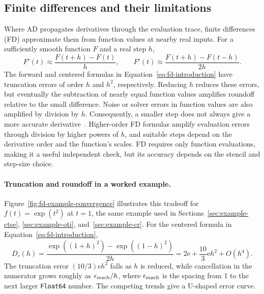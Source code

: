 \documentclass[10pt]{article}
\begin{document}
\subsection{Finite differences and their limitations}
\label{sec:fd-introduction}
Where AD propagates derivatives through the evaluation trace, finite
differences (FD) approximate them from function values at nearby real inputs. For a sufficiently smooth function $F$ and a real step $h$,
\begin{equation}
\label{eq:fd-introduction}
 F'(t)\approx\frac{F(t+h)-F(t)}{h},\qquad
 F'(t)\approx\frac{F(t+h)-F(t-h)}{2h}.
\end{equation}
The forward and centered formulas in Equation~\eqref{eq:fd-introduction} have
truncation errors of order $h$ and $h^2$, respectively. Reducing $h$ reduces these
errors, but eventually the subtraction of nearly equal function values amplifies
roundoff relative to the small difference. Noise or solver errors in function
values are also amplified by division by $h$. Consequently, a smaller step does
not always give a more accurate derivative~\cite{martins-guide}. Higher-order
FD formulas amplify evaluation errors through division by higher powers of $h$,
and suitable steps depend on the derivative order and the function's scales.
FD requires only function evaluations, making it a useful independent check,
but its accuracy depends on the stencil and step-size choice.


\newpage
\paragraph{Truncation and roundoff in a worked example.}
Figure~\ref{fig:fd-example-convergence} illustrates this tradeoff for
$f(t)=\exp(t^2)$ at $t=1$, the same example used in
Sections~\ref{sec:example-ctse}, \ref{sec:example-oti}, and~\ref{sec:example-cr}.
For the centered formula in Equation~\eqref{eq:fd-introduction},
\begin{equation}
\label{eq:fd-example-error}
 D_c(h)=\frac{\exp((1+h)^2)-\exp((1-h)^2)}{2h}
       =2\mathrm e+\frac{10}{3}\mathrm e h^2+O(h^4).
\end{equation}
The truncation error $(10/3)\mathrm e h^2$ falls as $h$ is reduced, while
cancellation in the numerator grows roughly as $\epsilon_{\rm mach}/h$, where
$\epsilon_{\rm mach}$ is the spacing from 1 to the next larger \texttt{Float64}
number. The competing trends give a U-shaped error curve.
\end{document}
